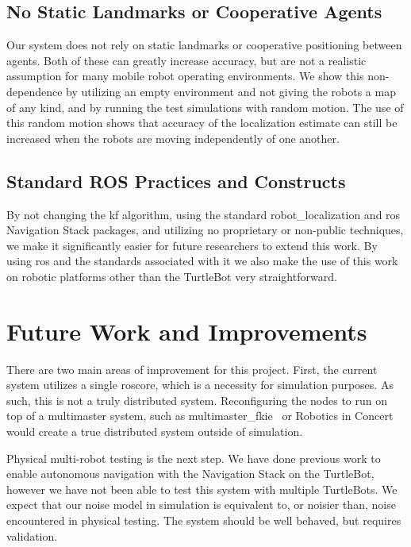 \documentclass[thesis.tex]{subfile}
\begin{document}
\subsection{No Static Landmarks or Cooperative Agents}
Our system does not rely on static landmarks or cooperative positioning between agents. Both of these can greatly increase accuracy, but are not a realistic assumption for many mobile robot operating environments. We show this non-dependence by utilizing an empty environment and not giving the robots a map of any kind, and by running the test simulations with random motion. The use of this random motion shows that accuracy of the localization estimate can still be increased when the robots are moving independently of one another.

\subsection{Standard ROS Practices and Constructs}
By not changing the \gls{kf} algorithm, using the standard robot\_localization and \gls{ros} Navigation Stack packages, and utilizing no proprietary or non-public techniques, we make it significantly easier for future researchers to extend this work. By using \gls{ros} and the standards associated with it we also make the use of this work on robotic platforms other than the TurtleBot very straightforward.

\section{Future Work and Improvements}
There are two main areas of improvement for this project. First, the current system utilizes a single roscore, which is a necessity for simulation purposes. As such, this is not a truly distributed system. Reconfiguring the nodes to run on top of a multimaster system, such as multimaster\_fkie~\cite{Tiderko} or Robotics in Concert~\cite{StonierLeeKimEtAl2016} would create a true distributed system outside of simulation.

Physical multi-robot testing is the next step. We have done previous work to enable autonomous navigation with the Navigation Stack on the TurtleBot, however we have not been able to test this system with multiple TurtleBots. We expect that our noise model in simulation is equivalent to, or noisier than, noise encountered in physical testing. The system should be well behaved, but requires validation.
\end{document}
